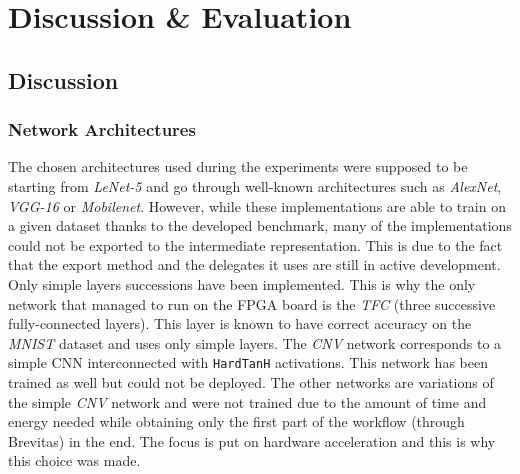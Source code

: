 \chapter{Discussion \& Evaluation} %

\label{Chapter8} %



\section{Discussion}


\subsection{Network Architectures}

The chosen architectures used during the experiments were supposed to be starting from \emph{LeNet-5} and go through well-known architectures such as \emph{AlexNet}, \emph{VGG-16} or \emph{Mobilenet}. However, while these implementations are able to train on a given dataset thanks to the developed benchmark, many of the implementations could not be exported to the intermediate representation. This is due to the fact that the export method and the delegates it uses are still in active development. Only simple layers successions have been implemented. This is why the only network that managed to run on the FPGA board is the \emph{TFC} (three successive fully-connected layers). This layer is known to have correct accuracy on the \emph{MNIST} dataset and uses only simple layers. The \emph{CNV} network corresponds to a simple CNN interconnected with \texttt{HardTanH} activations. This network has been trained as well but could not be deployed. The other networks are variations of the simple \emph{CNV} network and were not trained due to the amount of time and energy needed while obtaining only the first part of the workflow (through Brevitas) in the end. The focus is put on hardware acceleration and this is why this choice was made.

